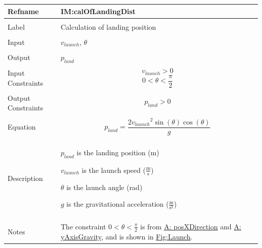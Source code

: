 \documentclass[12pt]{article}
\begin{document}
\noindent \begin{minipage}{\textwidth}
\begin{tabular}{>{\raggedright}p{}>{\raggedright\arraybackslash}p{}}
\toprule \textbf{Refname} & \textbf{IM:calOfLandingDist}
\label{IM:calOfLandingDist}
\\ \midrule \\
Label & Calculation of landing position
\\ \midrule \\
Input & ${v_{launch}}$, $θ$
\\ \midrule \\
Output & ${p_{land}}$
\\ \midrule \\
Input Constraints & \begin{displaymath}
                    {v_{launch}}>0
                    \end{displaymath}
                    \begin{displaymath}
                    0<θ<\frac{π}{2}
                    \end{displaymath}
\\ \midrule \\
Output Constraints & \begin{displaymath}
                     {p_{land}}>0
                     \end{displaymath}
\\ \midrule \\
Equation & \begin{displaymath}
           {p_{land}}=\frac{2 {v_{launch}}^{2} \sin\left(θ\right) \cos\left(θ\right)}{g}
           \end{displaymath}
\\ \midrule \\
Description & \begin{symbDescription}
              \item{${p_{land}}$ is the landing position (m)}
              \item{${v_{launch}}$ is the launch speed ($\frac{\text{m}}{\text{s}}$)}
              \item{$θ$ is the launch angle (rad)}
              \item{$g$ is the gravitational acceleration ($\frac{\text{m}}{\text{s}^{2}}$)}
              \end{symbDescription}
\\ \midrule \\
Notes & The constraint $0<θ<\frac{π}{2}$ is from \hyperref[posXDirection]{A: posXDirection} and \hyperref[yAxisGravity]{A: yAxisGravity}, and is shown in \hyperref[Figure:Launch]{Fig:Launch}.

\end{tabular}
\end{minipage}
\end{document}
